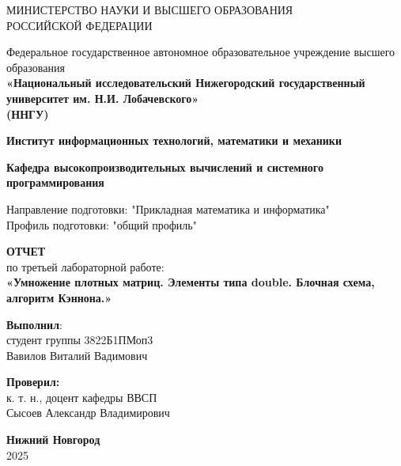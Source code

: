 \documentclass[a4paper,12pt]{article}
\begin{document}
\begin{titlepage}
\centering
{МИНИСТЕРСТВО НАУКИ И ВЫСШЕГО ОБРАЗОВАНИЯ\\
РОССИЙСКОЙ ФЕДЕРАЦИИ}

\vspace{1em}

Федеральное государственное автономное образовательное учреждение высшего образования\\
\textbf{«Национальный исследовательский Нижегородский государственный университет им. Н.И. Лобачевского»}\\
\textbf{(ННГУ)}

\vspace{2em}

\textbf{Институт информационных технологий, математики и механики}

\vspace{1em}

\textbf{Кафедра высокопроизводительных вычислений и системного программирования}

\vspace{2em}

Направление подготовки: "Прикладная математика и информатика"\\
Профиль подготовки: "общий профиль" \\

\vspace{4em}


\textbf{\Large ОТЧЕТ}\\
по третьей лабораторной работе:\\
\vspace{1em}
\textbf{«Умножение плотных матриц. Элементы типа double. Блочная схема, алгоритм Кэннона.»}

\begin{flushright}
\textbf{Выполнил}:\\[5pt]
студент группы {3822Б1ПМоп3} \\[1em]
{Вавилов Виталий Вадимович}
\end{flushright}

\vspace{1em}

\begin{flushright}

\noindent\textbf{Проверил:} \\[5pt]
к. т. н., доцент кафедры ВВСП \\[5pt]
{Сысоев Александр Владимирович}
\end{flushright}

\vspace{1em}

\vfill
\textbf{Нижний Новгород}\\
2025
\end{titlepage}
\end{document}
